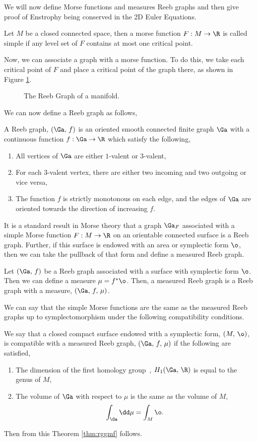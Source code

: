\noindent
We will now define Morse functions and measures Reeb graphs and then give proof of Enstrophy being conserved in the 2D Euler Equations.
\begin{ndefi}
  Let $M$ be a closed connected space, then a morse function $F : M \to \R$ is called simple if any level set of $F$ contains at most one critical point.
\end{ndefi}
\noindent
Now, we can associate a graph with a morse function. To do this, we take each critical point of $F$ and place a critical point of the graph there, as shown in Figure \ref{fig:reeb}.
\begin{figure}[!ht]
\centering
\resizebox{0.6\textwidth}{!}{}
\caption{The Reeb Graph of a manifold.}
\label{fig:reeb}
\end{figure}
\noindent
We can now define a Reeb graph as follows,
\begin{ndefi}
  A Reeb  graph, $(\Ga,\, f)$ is an oriented smooth connected finite graph $\Ga$ with a continuous function $f : \Ga \to \R$ which satisfy the following,
  \begin{enumerate}
    \item All vertices of $\Ga$ are either $1$-valent or $3$-valent,
    \item For each $3$-valent vertex, there are either two incoming and two outgoing or vice versa,
    \item The function $f$ is strictly monotonous on each edge, and the edges of $\Ga$ are oriented towards the direction of increasing $f$.
  \end{enumerate}
\end{ndefi}
\noindent
It is a standard result in Morse theory that a graph $\Ga_F$ associated with a simple Morse function $F : M \to \R$ on an orientable connected surface is a Reeb graph. Further, if this surface is endowed with an area or symplectic form $\o$, then we can take the pullback of that form and define a measured Reeb graph.
\begin{ndefi}
  Let $(\Ga,\, f)$ be a Reeb graph associated with a surface with symplectic form $\o$. Then we can define a measure $\mu = f^*\o$. Then, a measured Reeb graph is a Reeb graph with a measure, $(\Ga,\, f,\, \mu)$.
\end{ndefi}
\noindent
We can say that the simple Morse functions are the same as the measured Reeb graphs up to symplectomorphism under the following compatibility conditions.
\begin{ndefi}[Compatible]
  We say that a closed compact surface endowed with a symplectic form, $(M,\, \o)$, is compatible with a measured Reeb graph, $(\Ga,\, f,\, \mu)$ if the following are satisfied,
	\begin{enumerate}
		\item The dimension of the first homology group~\cite{hatcher}, $H_1(\Ga,\, \R)$ is equal to the genus of $M$,
		\item The volume of $\Ga$ with respect to $\mu$ is the same as the volume of $M$,
		$$ \int_\Ga \dd \mu = \int_M \o. $$
	\end{enumerate}
\end{ndefi}
\noindent
Then from this Theorem \ref{thm:rggmf} follows.

